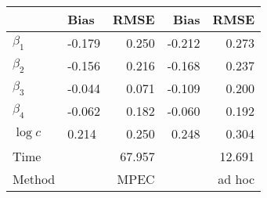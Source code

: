 
\begin{tabular}[t]{llrrr}
\toprule
  & Bias & RMSE & Bias & RMSE\\
\midrule
$\beta_{1}$ & -0.179 & 0.250 & -0.212 & 0.273\\
$\beta_{2}$ & -0.156 & 0.216 & -0.168 & 0.237\\
$\beta_{3}$ & -0.044 & 0.071 & -0.109 & 0.200\\
$\beta_{4}$ & -0.062 & 0.182 & -0.060 & 0.192\\
$\log c$ & 0.214 & 0.250 & 0.248 & 0.304\\
Time &  & 67.957 &  & 12.691\\
Method &  & MPEC &  & ad hoc\\
\bottomrule
\end{tabular}
